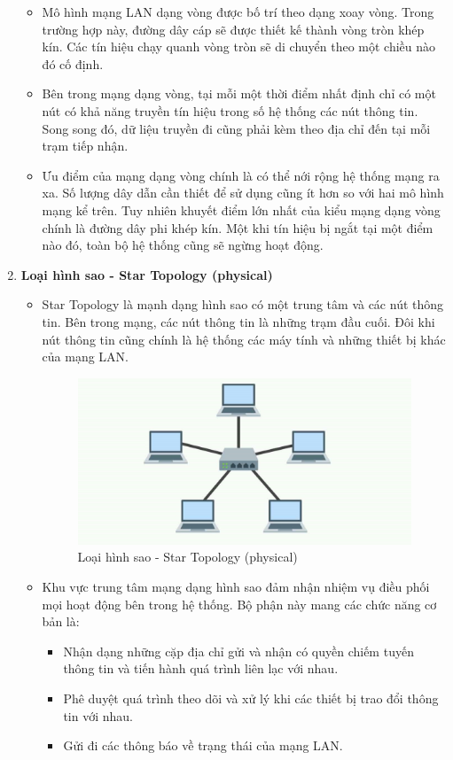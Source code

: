 \documentclass[13pt]{article}
\begin{document}
\begin{enumerate}
    \begin{itemize}
        \item Mô hình mạng LAN dạng vòng được bố trí theo dạng xoay vòng. Trong trường hợp này, đường dây cáp sẽ được thiết kế thành vòng tròn khép kín. Các tín hiệu chạy quanh vòng tròn sẽ di chuyển theo một chiều nào đó cố định.
        \item Bên trong mạng dạng vòng, tại mỗi một thời điểm nhất định chỉ có một nút có khả năng truyền tín hiệu trong số hệ thống các nút thông tin. Song song đó, dữ liệu truyền đi cũng phải kèm theo địa chỉ đến tại mỗi trạm tiếp nhận.
        \item Ưu điểm của mạng dạng vòng chính là có thể nới rộng hệ thống mạng ra xa. Số lượng dây dẫn cần thiết để sử dụng cũng ít hơn so với hai mô hình mạng kể trên. Tuy nhiên khuyết điểm lớn nhất của kiểu mạng dạng vòng chính là đường dây phi khép kín. Một khi tín hiệu bị ngắt tại một điểm nào đó, toàn bộ hệ thống cũng sẽ ngừng hoạt động.
    \end{itemize}

    \item \textbf{Loại hình sao - Star Topology (physical)}

    \begin{itemize}
        \item Star Topology là mạnh dạng hình sao có một trung tâm và các nút thông tin. Bên trong mạng, các nút thông tin là những trạm đầu cuối. Đôi khi nút thông tin cũng chính là hệ thống các máy tính và những thiết bị khác của mạng LAN.
     \begin{figure}[h!]
        \centering
        \includegraphics[width=0.7\linewidth]{image/7.jpg}
            \caption{Loại hình sao - Star Topology (physical)}
            \label{fig:label1}
    \end{figure}
    
        \item Khu vực trung tâm mạng dạng hình sao đảm nhận nhiệm vụ điều phối mọi hoạt động bên trong hệ thống. Bộ phận này mang các chức năng cơ bản là:
        \begin{itemize}
            \item Nhận dạng những cặp địa chỉ gửi và nhận có quyền chiếm tuyến thông tin và tiến hành quá trình liên lạc với nhau.
            \item Phê duyệt quá trình theo dõi và xử lý khi các thiết bị trao đổi thông tin với nhau.
            \item Gửi đi các thông báo về trạng thái của mạng LAN.
        \end{itemize}
    

\end{itemize}
\end{enumerate}
\end{document}
